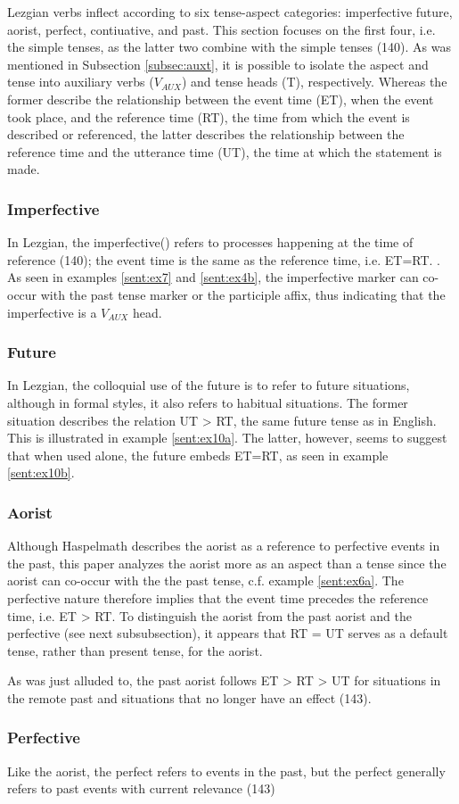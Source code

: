 Lezgian verbs inflect according to six tense-aspect categories: imperfective future, aorist, perfect, contiuative, and past. This section focuses on the first four, i.e. the simple tenses, as the latter two combine with the simple tenses (140). As was mentioned in Subsection \ref{subsec:auxt}, it is possible to isolate the aspect and tense into auxiliary verbs ($V_{AUX}$) and tense heads (T), respectively. Whereas the former describe the relationship between the event time (ET), when the event took place, and the reference time (RT), the time from which the event is described or referenced, the latter describes the relationship between the reference time and the utterance time (UT), the time at which the statement is made.
\subsubsection{Imperfective}
In Lezgian, the imperfective(\Impf[]) refers to processes happening at the time of reference (140); the event time is the same as the reference time, i.e. ET=RT. . As seen in examples \ref{sent:ex7} and \ref{sent:ex4b}, the imperfective marker can co-occur with the past tense marker or the participle affix, thus indicating that the imperfective is a $V_{AUX}$ head.
\subsubsection{Future}
In Lezgian, the colloquial use of the future is to refer to future situations, although in formal styles, it also refers to habitual situations. The former situation describes the relation UT > RT, the same future tense as in English. This is illustrated in example \ref{sent:ex10a}. The latter, however, seems to suggest that when used alone, the future embeds ET=RT, as seen in example \ref{sent:ex10b}. 
\subsubsection{Aorist}
Although Haspelmath describes the aorist as a reference to perfective events in the past, this paper analyzes the aorist more as an aspect than a tense since the aorist can co-occur with the the past tense, c.f. example \ref{sent:ex6a}. The perfective nature therefore implies that the event time precedes the reference time, i.e. ET > RT. To distinguish the aorist from the past aorist and the perfective (see next subsubsection), it appears that RT = UT serves as a default tense, rather than present tense, for the aorist.

As was just alluded to, the past aorist follows ET > RT > UT for situations in the remote past and situations that no longer have an effect (143).
\subsubsection{Perfective}
\label{subsec:perf}
Like the aorist, the perfect refers to events in the past, but the perfect generally refers to past events with current relevance (143)